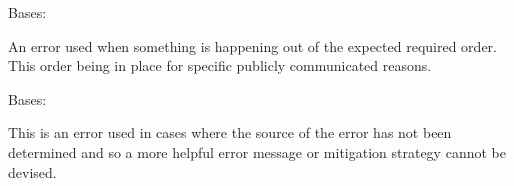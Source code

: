 \documentclass[letterpaper,11pt,english]{sphinxmanual}
\begin{document}

\begin{savenotes}\begin{fulllineitems}
\label{\detokenize{code/opihiexarata.library.error:opihiexarata.library.error.SequentialOrderError}}
\pysigstartsignatures
{}
\pysigstopsignatures
\sphinxAtStartPar
Bases: {\hyperref[\detokenize{code/opihiexarata.library.error:opihiexarata.library.error.ExarataException}]{}}

\sphinxAtStartPar
An error used when something is happening out of the expected required
order. This order being in place for specific publicly communicated
reasons.

\end{fulllineitems}\end{savenotes}


\begin{savenotes}\begin{fulllineitems}
\label{\detokenize{code/opihiexarata.library.error:opihiexarata.library.error.UndiscoveredError}}
\pysigstartsignatures
{}
\pysigstopsignatures
\sphinxAtStartPar
Bases: {\hyperref[\detokenize{code/opihiexarata.library.error:opihiexarata.library.error.ExarataBaseException}]{}}

\sphinxAtStartPar
This is an error used in cases where the source of the error has not
been determined and so a more helpful error message or mitigation strategy
cannot be devised.

\end{fulllineitems}\end{savenotes}
\end{document}
